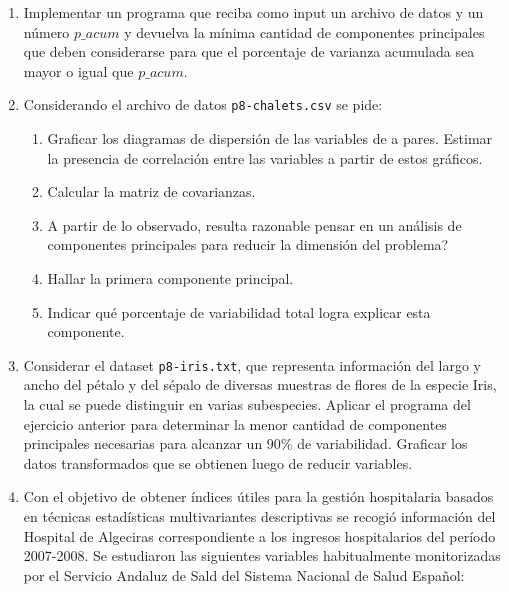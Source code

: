 \documentclass[12pt]{article}
\begin{document}
\begin{enumerate}
\item Implementar un programa que reciba como input un archivo de datos  y un n\'umero \textit{$p\_acum$} y devuelva la m\'inima cantidad de componentes principales que deben considerarse para que el porcentaje de varianza acumulada sea mayor o igual que \textit{$p\_acum$}.

\item Considerando el archivo de datos \lstinline{p8-chalets.csv} se pide:

\begin{enumerate}
	\item Graficar los diagramas de dispersi\'on de las variables de a pares. Estimar la presencia de correlaci\'on entre las variables a partir de estos gr\'aficos.
	\item Calcular la matriz de covarianzas.
	\item A partir de lo observado, resulta razonable pensar en un an\'alisis de componentes principales para reducir la dimensi\'on del problema?
	\item Hallar la primera componente principal.
	\item Indicar qu\'e porcentaje de variabilidad total logra explicar esta componente. %
\end{enumerate}





\item Considerar el dataset \lstinline{p8-iris.txt}, que representa informaci\'on del largo y ancho del p\'etalo y del s\'epalo de diversas muestras de flores de la especie Iris, la cual se puede distinguir en varias subespecies. Aplicar el programa del ejercicio anterior para determinar la menor cantidad de componentes principales necesarias para alcanzar un $90\%$ de variabilidad. Graficar los datos transformados que se obtienen luego de reducir variables.


\item Con el objetivo de obtener \'indices \'utiles para la gesti\'on hospitalaria basados en t\'ecnicas estad\'isticas multivariantes descriptivas se recogi\'o informaci\'on del Hospital de Algeciras correspondiente a los ingresos hospitalarios del per\'iodo 2007-2008. Se estudiaron las siguientes variables habitualmente monitorizadas por el Servicio Andaluz de Sald del Sistema Nacional de Salud Espa\~nol:


\end{enumerate}
\end{document}
